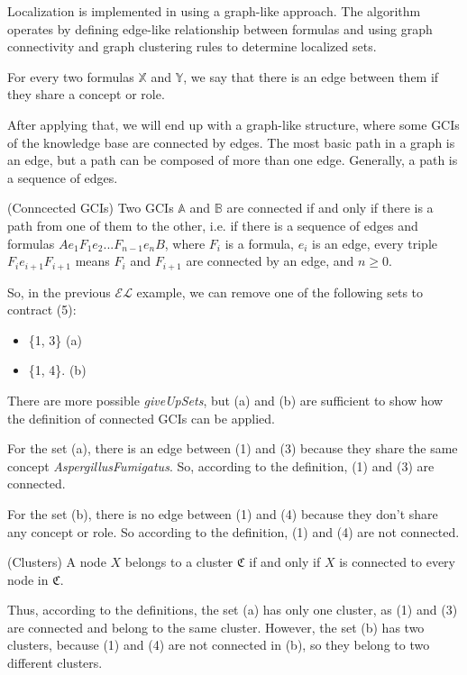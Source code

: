 Localization is implemented in \cite{zwei} using a graph-like approach. The algorithm operates by defining edge-like relationship between formulas and using graph connectivity and graph clustering rules to determine localized sets. 

\begin{defn}
For every two formulas $\mathbb{X}$ and $\mathbb{Y}$, we say that there is an edge between them if they share a concept or role.
\end{defn}

After applying that, we will end up with a graph-like structure, where some GCIs of the knowledge base are connected by edges. The most basic path in a graph is an edge, but a path can be composed of more than one edge. Generally, a path is a sequence of edges.

\begin{defn}(Conncected GCIs)
Two GCIs $\mathbb{A}$ and $\mathbb{B}$ are connected if and only if there is a path from one of them to the other, i.e. if there is a sequence of edges and formulas $Ae_1F_1e_2 ... F_{n-1}e_nB$, where $F_i$ is a formula, $e_i$ is an edge, every triple $F_ie_{i+1}F_{i+1}$ means $F_i$ and $F_{i+1}$ are connected by an edge, and $n \geq 0$.
\end{defn}

So, in the previous $\mathcal{EL}$ example, we can remove one of the following sets to contract (5):
\begin{itemize}
\item \{1, 3\} (a)
\item \{1, 4\}. (b)
\end{itemize}

There are more possible \textit{giveUpSets}, but (a) and (b) are sufficient to show how the definition of connected GCIs can be applied. 

For the set (a), there is an edge between (1) and (3) because they share the same concept \textit{AspergillusFumigatus}. So, according to the definition, (1) and (3) are connected.

For the set (b), there is no edge between (1) and (4) because they don't share any concept or role. So according to the definition, (1) and (4) are not connected.

\begin{defn}(Clusters)
A node $X$ belongs to a cluster $\mathfrak{C}$ if and only if $X$ is connected to every node in $\mathfrak{C}$.
\end{defn}

Thus, according to the definitions, the set (a) has only one cluster, as (1) and (3) are connected and belong to the same cluster. However, the set (b) has two clusters, because (1) and (4) are not connected in (b), so they belong to two different clusters.

